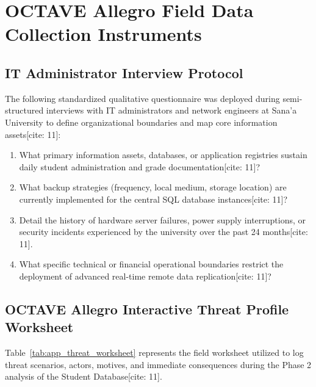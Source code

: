 \documentclass[journal,onecolumn,12pt,twoside]{IEEEtran}
\begin{document}
	\newpage
	\appendix
	\section{OCTAVE Allegro Field Data Collection Instruments}
	\label{app:octave_instruments}
	
	\subsection{IT Administrator Interview Protocol}
	The following standardized qualitative questionnaire was deployed during semi-structured interviews with IT administrators and network engineers at Sana'a University to define organizational boundaries and map core information assets[cite: 11]:
	\begin{enumerate}
		\item What primary information assets, databases, or application registries sustain daily student administration and grade documentation[cite: 11]?
		\item What backup strategies (frequency, local medium, storage location) are currently implemented for the central SQL database instances[cite: 11]?
		\item Detail the history of hardware server failures, power supply interruptions, or security incidents experienced by the university over the past 24 months[cite: 11].
		\item What specific technical or financial operational boundaries restrict the deployment of advanced real-time remote data replication[cite: 11]?
	\end{enumerate}
	
	\subsection{OCTAVE Allegro Interactive Threat Profile Worksheet}
	Table~\ref{tab:app_threat_worksheet} represents the field worksheet utilized to log threat scenarios, actors, motives, and immediate consequences during the Phase 2 analysis of the Student Database[cite: 11].
	
\end{document}
